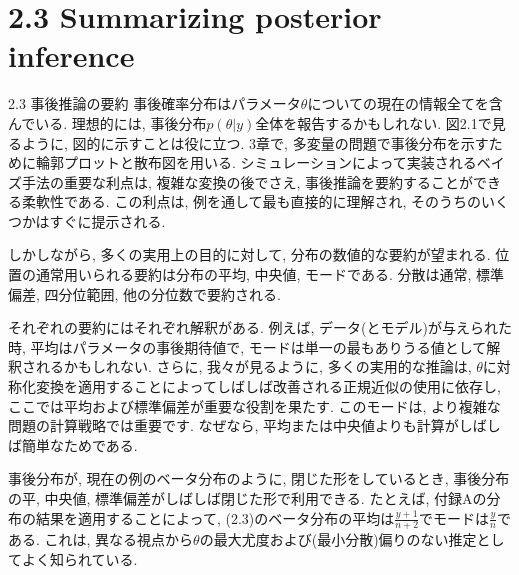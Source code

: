 \documentclass[10pt,dvipdfmx,a4]{beamer}
\begin{document}
\section{2.3 Summarizing posterior inference}
\begin{frame}{2.3 事後推論の要約}
事後確率分布はパラメータ$\theta$についての現在の情報全てを含んでいる.
理想的には, 事後分布$p(\theta|y)$全体を報告するかもしれない.
図2.1で見るように, 図的に示すことは役に立つ.
3章で, 多変量の問題で事後分布を示すために輪郭プロットと散布図を用いる.
シミュレーションによって実装されるベイズ手法の重要な利点は, 複雑な変換の後でさえ, 事後推論を要約することができる柔軟性である.
この利点は, 例を通して最も直接的に理解され, そのうちのいくつかはすぐに提示される.

しかしながら, 多くの実用上の目的に対して, 分布の数値的な要約が望まれる.
位置の通常用いられる要約は分布の平均, 中央値, モードである.
分散は通常, 標準偏差, 四分位範囲, 他の分位数で要約される.
\end{frame}


\begin{frame}
それぞれの要約にはそれぞれ解釈がある.
例えば, データ(とモデル)が与えられた時, 平均はパラメータの事後期待値で, モードは単一の最もありうる値として解釈されるかもしれない.
さらに, 我々が見るように, 多くの実用的な推論は, $\theta$に対称化変換を適用することによってしばしば改善される正規近似の使用に依存し, ここでは平均および標準偏差が重要な役割を果たす.
このモードは, より複雑な問題の計算戦略では重要です.
なぜなら, 平均または中央値よりも計算がしばしば簡単なためである.

事後分布が, 現在の例のベータ分布のように, 閉じた形をしているとき, 事後分布の平, 中央値, 標準偏差がしばしば閉じた形で利用できる.
たとえば, 付録Aの分布の結果を適用することによって, (2.3)のベータ分布の平均は$\tfrac{y+1}{n+2}$でモードは$\frac{y}{n}$である.
これは, 異なる視点から$\theta$の最大尤度および(最小分散)偏りのない推定としてよく知られている.
\end{frame}

\end{document}

